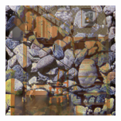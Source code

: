 \begin{figure}[]
\begin{subfigure}{\textwidth}
\begin{subfigure}{0.19\textwidth}
            \caption*{}
        \end{subfigure}
        \hfill
        \begin{subfigure}{0.19\textwidth}
            \centering
            \includegraphics[width=\textwidth]{images/04-experiment03/staircase_illum/pebbles/pixel_proj.jpg}
            \caption*{}
        \end{subfigure}
        

\end{subfigure}
\end{figure}
